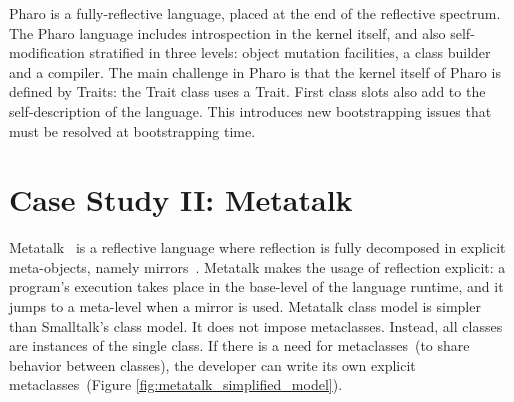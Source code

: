 Pharo is a fully-reflective language, placed at the end of the reflective spectrum. The Pharo language includes introspection in the kernel itself, and also self-modification stratified in three levels: object mutation facilities, a class builder and a compiler. The main challenge in Pharo is that the kernel itself of Pharo is defined by Traits: \eg the Trait class uses a Trait. First class slots also add to the self-description of the language. This introduces new bootstrapping issues that must be resolved at bootstrapping time.




\section{Case Study II: Metatalk} \label{sec:bootstrap_metatalk}

Metatalk~\cite{Papo11a} is a reflective language where reflection is fully decomposed in explicit meta-objects, namely mirrors~\cite{Brac04b}. Metatalk makes the usage of reflection explicit: a program's execution takes place in the base-level of the language runtime, and it jumps to a meta-level when a mirror is used. Metatalk class model is simpler than Smalltalk's class model. It does not impose metaclasses. Instead, all classes are instances of the single  class. If there is a need for metaclasses~(to share behavior between classes), the developer can write its own explicit metaclasses~(Figure \ref{fig:metatalk_simplified_model}).

